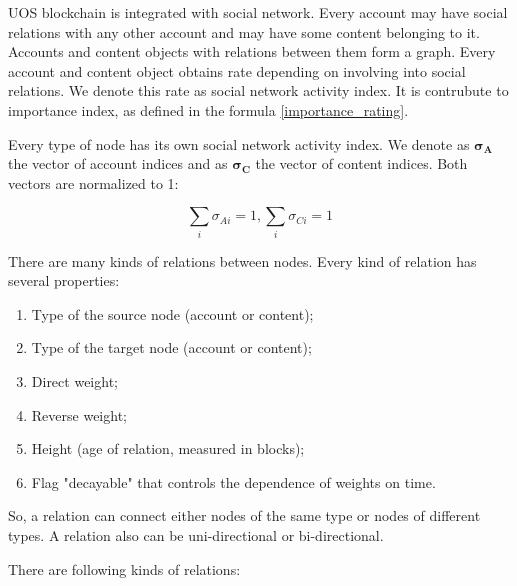 \documentclass[a4paper,12pt]{article}
\begin{document}
U{\degree}OS blockchain is integrated with social network. Every account may have social relations with any other account and may have some content belonging to it. Accounts and content objects with relations between them form a graph. Every account and content object obtains rate depending on involving into social relations. We denote this rate as social network activity index. It is contrubute to importance index, as defined in the formula \ref{importance_rating}.

Every type of node has its own social network activity index. We denote as $\boldsymbol{\sigma_A}$ the vector of account indices and as $\boldsymbol{\sigma_C}$ the vector of content indices. Both vectors are normalized to 1:

$$
\sum_i{\sigma_{Ai}} = 1, \sum_i{\sigma_{Ci}} = 1
$$

There are many kinds of relations between nodes. Every kind of relation has several properties:


\begin{enumerate}
    \item {Type of the source node (account or content)};
    \item {Type of the target node (account or content)};
    \item {Direct weight};
    \item {Reverse weight};
    \item {Height (age of relation, measured in blocks)};
    \item {Flag "decayable" that controls the dependence of weights on time}.
\end{enumerate}

So, a relation can connect either nodes of the same type or nodes of different types. A relation also can be uni-directional or bi-directional.

There are following kinds of relations:
\end{document}
